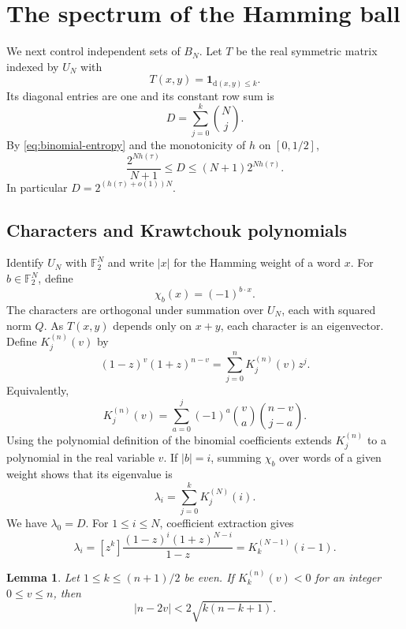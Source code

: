 \documentclass[11pt,leqno]{amsart}
\numberwithin{equation}{section}
\newtheorem{lemma}[theorem]{Lemma}
\theoremstyle{definition}
\theoremstyle{remark}
\newcommand{\F}{\mathbb F}
\newcommand{\one}{\mathbf 1}
\newcommand{\dist}{\mathrm d}
\newcommand{\abs}[1]{\lvert#1\rvert}
\begin{document}
\section{The spectrum of the Hamming ball}

We next control independent sets of $B_N$. Let $T$ be the real symmetric matrix indexed by $U_N$ with
\[
 T(x,y)=\one_{\dist(x,y)\le k}.
\]
Its diagonal entries are one and its constant row sum is
\begin{equation}\label{eq:degree}
 D=\sum_{j=0}^k\binom Nj.
\end{equation}
By \eqref{eq:binomial-entropy} and the monotonicity of $h$ on $[0,1/2]$,
\begin{equation}\label{eq:D-bounds}
 \frac{2^{Nh(\tau)}}{N+1}\le D\le(N+1)2^{Nh(\tau)}.
\end{equation}
In particular $D=2^{(h(\tau)+o(1))N}$.

\subsection{Characters and Krawtchouk polynomials}

Identify $U_N$ with $\F_2^N$ and write $\abs x$ for the Hamming weight of a word $x$. For $b\in\F_2^N$, define
\[
 \chi_b(x)=(-1)^{b\cdot x}.
\]
The characters are orthogonal under summation over $U_N$, each with squared norm $Q$. As $T(x,y)$ depends only on $x+y$, each character is an eigenvector. Define $K_j^{(n)}(v)$ by
\begin{equation}\label{eq:K-generating}
 (1-z)^v(1+z)^{n-v}=\sum_{j=0}^n K_j^{(n)}(v)z^j.
\end{equation}
Equivalently,
\[
 K_j^{(n)}(v)=\sum_{a=0}^j(-1)^a\binom va\binom{n-v}{j-a}.
\]
Using the polynomial definition of the binomial coefficients extends $K_j^{(n)}$ to a polynomial in the real variable $v$.
If $\abs{b}=i$, summing $\chi_b$ over words of a given weight shows that its eigenvalue is
\[
 \lambda_i=\sum_{j=0}^k K_j^{(N)}(i).
\]
We have $\lambda_0=D$. For $1\le i\le N$, coefficient extraction gives
\begin{equation}\label{eq:partial-sum}
 \lambda_i=[z^k]\frac{(1-z)^i(1+z)^{N-i}}{1-z}
 =K_k^{(N-1)}(i-1).
\end{equation}

\begin{lemma}\label{lem:root-location}
Let $1\le k\le(n+1)/2$ be even. If $K_k^{(n)}(v)<0$ for an integer $0\le v\le n$, then
\begin{equation}\label{eq:root-location}
 \abs{n-2v}<2\sqrt{k(n-k+1)}.
\end{equation}
\end{lemma}
\end{document}
